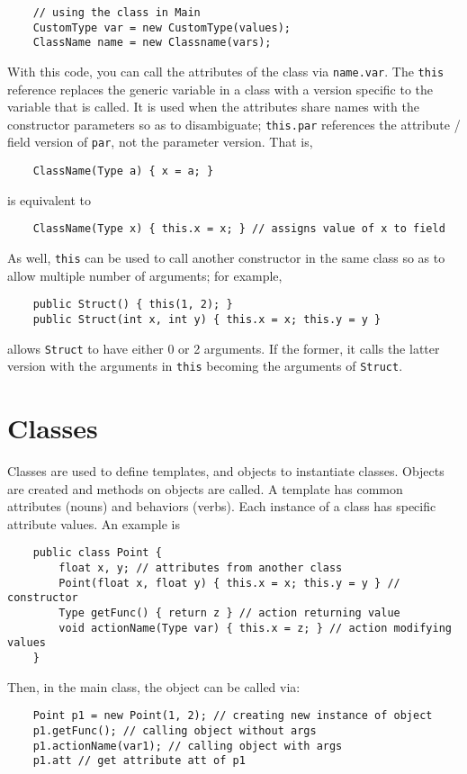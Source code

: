 \documentclass[letterpaper, openany, justified]{tufte-book}
\newcommand{\cd}[1]{\lstinline{#1}}
\begin{document}
\begin{fullwidth}
\begin{lstlisting}
    // using the class in Main
    CustomType var = new CustomType(values);
    ClassName name = new Classname(vars);
\end{lstlisting}
With this code, you can call the attributes of the class via \cd{name.var}. The \cd{this} reference replaces the generic variable in a class with a version specific to the variable that is called. It is used when the attributes share names with the constructor parameters so as to disambiguate; \cd{this.par} references the attribute / field version of \cd{par}, not the parameter version. That is,
\begin{lstlisting}
    ClassName(Type a) { x = a; }
\end{lstlisting}
is equivalent to
\begin{lstlisting}
    ClassName(Type x) { this.x = x; } // assigns value of x to field
\end{lstlisting}
As well, \cd{this} can be used to call another constructor in the same class so as to allow multiple number of arguments; for example,
\begin{lstlisting}
    public Struct() { this(1, 2); }
    public Struct(int x, int y) { this.x = x; this.y = y }
\end{lstlisting}
allows \cd{Struct} to have either 0 or 2 arguments. If the former, it calls the latter version with the arguments in \cd{this} becoming the arguments of \cd{Struct}.

\section{Classes}

Classes are used to define templates, and objects to instantiate classes. Objects are created and methods on objects are called. A template has common attributes (nouns) and behaviors (verbs). Each instance of a class has specific attribute values. An example is
\begin{lstlisting}
    public class Point {
        float x, y; // attributes from another class
        Point(float x, float y) { this.x = x; this.y = y } // constructor
        Type getFunc() { return z } // action returning value
        void actionName(Type var) { this.x = z; } // action modifying values
    }
\end{lstlisting}
Then, in the main class, the object can be called via:
\begin{lstlisting}
    Point p1 = new Point(1, 2); // creating new instance of object
    p1.getFunc(); // calling object without args
    p1.actionName(var1); // calling object with args
    p1.att // get attribute att of p1
\end{lstlisting}


\end{fullwidth}
\end{document}
